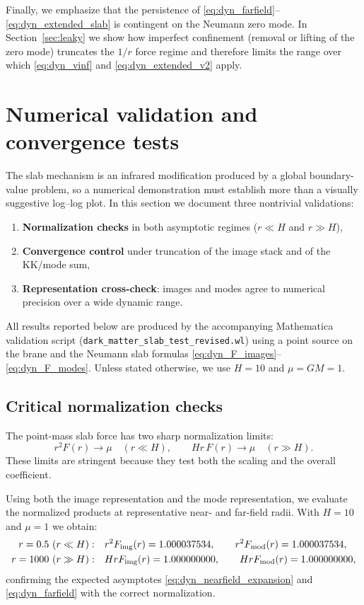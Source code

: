 \documentclass[11pt]{article}
\begin{document}
Finally, we emphasize that the persistence of \eqref{eq:dyn_farfield}--\eqref{eq:dyn_extended_slab}
is contingent on the Neumann zero mode.  In Section~\ref{sec:leaky} we show how imperfect confinement
(removal or lifting of the zero mode) truncates the $1/r$ force regime and therefore limits the range
over which \eqref{eq:dyn_vinf} and \eqref{eq:dyn_extended_v2} apply.

\section{Numerical validation and convergence tests}
\label{sec:numerics}

The slab mechanism is an infrared modification produced by a global boundary-value problem, so a
numerical demonstration must establish more than a visually suggestive log--log plot.  In this
section we document three nontrivial validations:

\begin{enumerate}
  \item \textbf{Normalization checks} in both asymptotic regimes ($r\ll H$ and $r\gg H$),
  \item \textbf{Convergence control} under truncation of the image stack and of the KK/mode sum,
  \item \textbf{Representation cross-check}: images and modes agree to numerical precision over a wide
        dynamic range.
\end{enumerate}

All results reported below are produced by the accompanying Mathematica validation script
(\texttt{dark\_matter\_slab\_test\_revised.wl}) using a point source on the brane and the Neumann slab
formulas \eqref{eq:dyn_F_images}--\eqref{eq:dyn_F_modes}.
Unless stated otherwise, we use $H=10$ and $\mu=GM=1$.

\subsection{Critical normalization checks}
\label{sec:numerics_norm}

The point-mass slab force has two sharp normalization limits:
\begin{equation}
  r^2 F(r)\to \mu \quad (r\ll H),
  \qquad
  Hr\,F(r)\to \mu \quad (r\gg H).
  \label{eq:numerics_norm_targets}
\end{equation}
These limits are stringent because they test both the scaling and the overall coefficient.

Using both the image representation and the mode representation, we evaluate the normalized products
at representative near- and far-field radii.  With $H=10$ and $\mu=1$ we obtain:
\begin{align}
  r=0.5\ (r\ll H): \quad & r^2 F_{\rm img}(r)=1.000037534,\qquad r^2 F_{\rm mod}(r)=1.000037534,\\
  r=1000\ (r\gg H): \quad & HrF_{\rm img}(r)=1.000000000,\qquad HrF_{\rm mod}(r)=1.000000000,
\end{align}
confirming the expected asymptotes \eqref{eq:dyn_nearfield_expansion} and \eqref{eq:dyn_farfield} with
the correct normalization.
\end{document}
